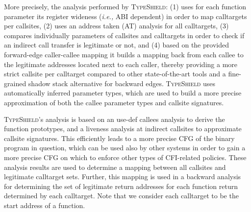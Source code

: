 More precisely, the analysis performed by \textsc{TypeShield}:
(1) uses for each function parameter its register wideness (\textit{i.e.,} ABI dependent) in order to map calltargets per callsites,  
(2) uses an address taken (AT) analysis for all calltargets, 
(3) compares individually parameters of callsites and calltargets in order to check if an indirect call transfer is legitimate or not, and
(4) based on the provided forward-edge caller-callee mapping it builds a mapping back from each callee to the legitimate addresses located next to each caller,
thereby providing a more strict callsite per calltarget compared to other state-of-the-art tools and a fine-grained shadow stack alternative for backward edges.
\textsc{TypeShield} uses automatically inferred parameter types, which are used to build a more precise approximation of both the callee parameter types and callsite signatures. 

\textsc{TypeShield}'s analysis is based on an use-def callees analysis 
to derive the function prototypes, and a liveness analysis at indirect callsites to approximate callsite signatures. 
This efficiently leads to a more precise CFG of the binary program in question, 
which can be used also by other systems in order to gain a more precise CFG on which to 
enforce other types of CFI-related policies. These analysis results are used to
determine a mapping between all callsites and legitimate calltarget sets. Further,
this mapping is used in a backward analysis for determining the set of legitimate 
return addresses for each function return determined by each calltarget. Note that 
we consider each calltarget to be the start address of a function.

